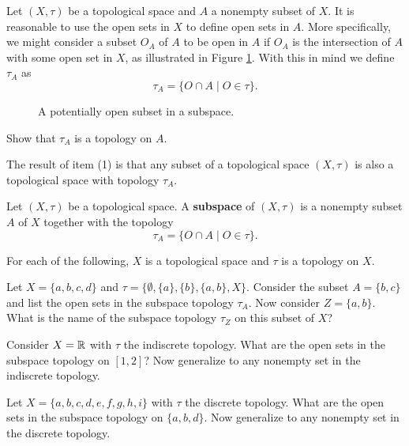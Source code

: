 \begin{pa} Let $(X, \tau)$ be a topological space and $A$ a nonempty subset of $X$. It is reasonable to use the open sets in $X$ to define open sets in $A$. More specifically, we might consider a subset $O_A$ of $A$ to be open in $A$ if $O_A$ is the intersection of $A$ with some open set in $X$, as illustrated in Figure \ref{F:Subspace_open}. With this in mind we define $\tau_A$ as 
\[\tau_A = \{O \cap A \mid O \in \tau\}.\]
\begin{figure}[h]
\begin{center}
\caption{A potentially open subset in a subspace.} 
\label{F:Subspace_open}
\end{center}
\end{figure}


\be
\item \label{act:TS_subspace} Show that $\tau_A$ is a topology on $A$.

\vspace{0.1in}

The result of item (1) is that any subset of a topological space $(X,\tau)$ is also a topological space with topology $\tau_A$. 

\begin{definition} \label{def:TS_subspace} Let $(X,\tau)$ be a topological space. A \textbf{subspace} of $(X,\tau)$ is a nonempty subset $A$ of $X$ together with the topology 
\[\tau_A = \{O \cap A \mid O \in \tau\}.\]
\end{definition}

\vspace{0.1in}

\item For each of the following, $X$ is a topological space and $\tau$ is a topology on $X$.
	\ba
	\item Let $X= \{a,b,c,d\}$ and $\tau = \{\emptyset, \{a\}, \{b\}, \{a,b\}, X \}$. Consider the subset $A=\{b,c\}$ and list the open sets in the subspace topology $\tau_A$. Now consider $Z = \{a,b\}$. What is the name of the subspace topology $\tau_Z$ on this subset of $X$?  

	\item  Consider $X=\mathbb{R}$ with $\tau$ the indiscrete topology.  What are the open sets in the subspace topology on $[1,2]$? Now generalize to any nonempty set in the indiscrete topology.

	\item Let $X = \{a,b,c,d,e,f,g,h,i\}$ with $\tau$ the discrete topology. What are the open sets in the subspace topology on $\{a,b,d\}$.  Now generalize to any nonempty set in the discrete topology.


\end{pa}
